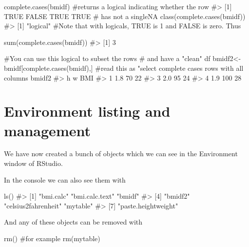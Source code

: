 \documentclass[
  letterpaper,
  DIV=11,
  numbers=noendperiod]{scrreprt}
\newenvironment{Shaded}{\begin{snugshade}}{\end{snugshade}}
\newcommand{\CommentTok}[1]{\textcolor[rgb]{0.37,0.37,0.37}{#1}}
\newcommand{\FunctionTok}[1]{\textcolor[rgb]{0.28,0.35,0.67}{#1}}
\newcommand{\NormalTok}[1]{\textcolor[rgb]{0.00,0.23,0.31}{#1}}
\newcommand{\OtherTok}[1]{\textcolor[rgb]{0.00,0.23,0.31}{#1}}
\begin{document}
\begin{Shaded}
\begin{Highlighting}[]
\FunctionTok{complete.cases}\NormalTok{(bmidf) }\CommentTok{\#returns a logical indicating whether the row }
\CommentTok{\#\textgreater{} [1]  TRUE FALSE  TRUE  TRUE}
\CommentTok{\# has not a singleNA}
\FunctionTok{class}\NormalTok{(}\FunctionTok{complete.cases}\NormalTok{(bmidf))}
\CommentTok{\#\textgreater{} [1] "logical"}
\CommentTok{\#Note that with logicals, TRUE is 1 and FALSE is zero. Thus}

\FunctionTok{sum}\NormalTok{(}\FunctionTok{complete.cases}\NormalTok{(bmidf))}
\CommentTok{\#\textgreater{} [1] 3}

\CommentTok{\#You can use this logical to subset the rows}
\CommentTok{\# and have a "clean" df}
\NormalTok{bmidf2}\OtherTok{\textless{}{-}}\NormalTok{bmidf[}\FunctionTok{complete.cases}\NormalTok{(bmidf),] }\CommentTok{\#read this as "select complete cases rows with all columns}
\NormalTok{bmidf2}
\CommentTok{\#\textgreater{}     h   w BMI}
\CommentTok{\#\textgreater{} 1 1.8  70  22}
\CommentTok{\#\textgreater{} 3 2.0  95  24}
\CommentTok{\#\textgreater{} 4 1.9 100  28}
\end{Highlighting}
\end{Shaded}

\section{Environment listing and
management}\label{environment-listing-and-management}

We have now created a bunch of objects which we can see in the
Environment window of RStudio.

In the console we can also see them with

\begin{Shaded}
\begin{Highlighting}[]
\FunctionTok{ls}\NormalTok{()}
\CommentTok{\#\textgreater{} [1] "bmi.calc"           "bmi.calc.text"      "bmidf"             }
\CommentTok{\#\textgreater{} [4] "bmidf2"             "celsius2fahrenheit" "mytable"           }
\CommentTok{\#\textgreater{} [7] "paste.heightweight"}
\end{Highlighting}
\end{Shaded}

And any of these objects can be removed with

\begin{Shaded}
\begin{Highlighting}[]
\FunctionTok{rm}\NormalTok{()}
\CommentTok{\#for example}
\FunctionTok{rm}\NormalTok{(mytable)}
\end{Highlighting}
\end{Shaded}
\end{document}
